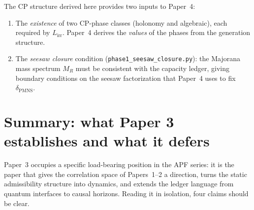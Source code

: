 \documentclass[11pt]{article}
\begin{document}
The CP structure derived here provides two inputs to Paper~4:

\begin{enumerate}[nosep]
\item The \emph{existence} of two CP-phase classes (holonomy and algebraic),
  each required by $L_{\mathrm{irr}}$.  Paper~4 derives the \emph{values} of
  the phases from the generation structure.

\item The \emph{seesaw closure} condition (\texttt{phase1\_seesaw\_closure.py}):
  the Majorana mass spectrum $M_R$ must be consistent with the capacity
  ledger, giving boundary conditions on the seesaw factorization that
  Paper~4 uses to fix $\delta_{\mathrm{PMNS}}$.
\end{enumerate}


\section{Summary: what Paper 3 establishes and what it defers}
\label{sec:conclusion}

Paper~3 occupies a specific load-bearing position in the APF series: it is
the paper that gives the correlation space of Papers~1--2 a direction,
turns the static admissibility structure into dynamics, and extends the
ledger language from quantum interfaces to causal horizons.  Reading it in
isolation, four claims should be clear.
\end{document}
